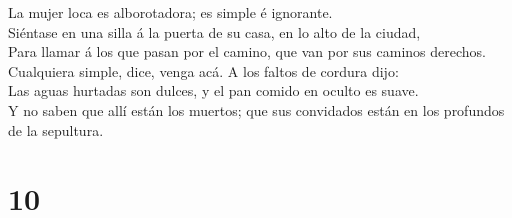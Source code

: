  La mujer loca es alborotadora; es simple é ignorante.\\
 Siéntase en una silla á la puerta de su casa, en lo alto
de la ciudad,\\
 Para llamar á los que pasan por el camino, que van por sus
caminos derechos.\\
 Cualquiera simple, dice, venga acá. A los faltos de
cordura dijo:\\
 Las aguas hurtadas son dulces, y el pan comido en oculto
es suave.\\
 Y no saben que allí están los muertos; que sus convidados
están en los profundos de la sepultura.

\hypertarget{section-9}{%
\section{10}\label{section-9}}

